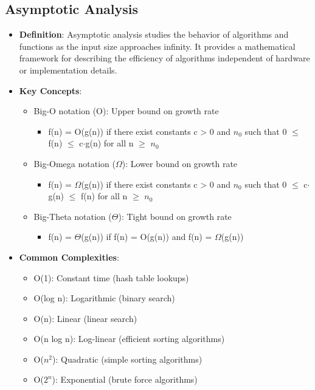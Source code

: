 \documentclass{article}
\begin{document}
\subsection{Asymptotic Analysis}
\begin{itemize}
    \item \textbf{Definition}: Asymptotic analysis studies the behavior of algorithms and functions as the input size approaches infinity. It provides a mathematical framework for describing the efficiency of algorithms independent of hardware or implementation details.
    
    \item \textbf{Key Concepts}:
    \begin{itemize}
        \item Big-O notation (O): Upper bound on growth rate
        \begin{itemize}
            \item f(n) = O(g(n)) if there exist constants c > 0 and $n_0$ such that 0 $\leq$ f(n) $\leq$ c$\cdot$g(n) for all n $\geq$ $n_0$
        \end{itemize}
        
        \item Big-Omega notation ($\Omega$): Lower bound on growth rate
        \begin{itemize}
            \item f(n) = $\Omega$(g(n)) if there exist constants c > 0 and $n_0$ such that 0 $\leq$ c$\cdot$g(n) $\leq$ f(n) for all n $\geq$ $n_0$
        \end{itemize}
        
        \item Big-Theta notation ($\Theta$): Tight bound on growth rate
        \begin{itemize}
            \item f(n) = $\Theta$(g(n)) if f(n) = O(g(n)) and f(n) = $\Omega$(g(n))
        \end{itemize}
    \end{itemize}
    
    \item \textbf{Common Complexities}:
    \begin{itemize}
        \item O(1): Constant time (hash table lookups)
        \item O(log n): Logarithmic (binary search)
        \item O(n): Linear (linear search)
        \item O(n log n): Log-linear (efficient sorting algorithms)
        \item O($n^2$): Quadratic (simple sorting algorithms)
        \item O($2^n$): Exponential (brute force algorithms)
    \end{itemize}
    

\end{itemize}
\end{document}
